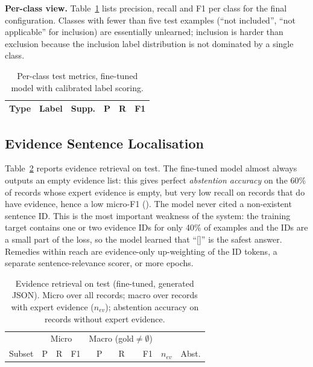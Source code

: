 \textbf{Per-class view.} Table~\ref{tab:perclass} lists precision, recall and F1 per class for the final configuration. Classes with fewer than five test examples (``not included'', ``not applicable'' for inclusion) are essentially unlearned; inclusion is harder than exclusion because the inclusion label distribution is not dominated by a single class.

\begin{table}[t]\centering\caption{Per-class test metrics, fine-tuned model with calibrated label scoring.}\label{tab:perclass}
\setlength{\tabcolsep}{3.5pt}
\begin{tabular}{llrrrr}\toprule
Type & Label & Supp. & P & R & F1\\\midrule

\bottomrule\end{tabular}\end{table}

\subsection{Evidence Sentence Localisation}
Table~\ref{tab:evidence} reports evidence retrieval on test. The fine-tuned model almost always outputs an empty evidence list: this gives perfect \emph{abstention accuracy} on the 60\% of records whose expert evidence is empty, but very low recall on records that do have evidence, hence a low micro-F1 (\ftTestEvF{}). The model never cited a non-existent sentence ID. This is the most important weakness of the system: the training target contains one or two evidence IDs for only 40\% of examples and the IDs are a small part of the loss, so the model learned that ``[]'' is the safest answer. Remedies within reach are evidence-only up-weighting of the ID tokens, a separate sentence-relevance scorer, or more epochs.

\begin{table}[t]\centering\caption{Evidence retrieval on test (fine-tuned, generated JSON). Micro over all records; macro over records with expert evidence ($n_{ev}$); abstention accuracy on records without expert evidence.}\label{tab:evidence}
\setlength{\tabcolsep}{3pt}
\begin{tabular}{lrrrrrrrr}\toprule
 & \multicolumn{3}{c}{Micro} & \multicolumn{3}{c}{Macro (gold$\neq\emptyset$)} & & \\
Subset & P & R & F1 & P & R & F1 & $n_{ev}$ & Abst.\\\midrule

\bottomrule\end{tabular}\end{table}


